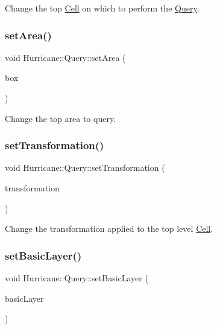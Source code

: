 Change the top \mbox{\hyperlink{classHurricane_1_1Cell}{Cell}} on which to perform the \mbox{\hyperlink{classHurricane_1_1Query}{Query}}. \mbox{\label{classHurricane_1_1Query_ac41de6b1535c256c4929c075769890b1}} 
\subsubsection{\texorpdfstring{set\+Area()}{setArea()}}
{\footnotesize\ttfamily void Hurricane\+::\+Query\+::set\+Area (\begin{DoxyParamCaption}\item[{const \mbox{\hyperlink{classHurricane_1_1Box}{Box}} \&}]{box }\end{DoxyParamCaption})\hspace{0.3cm}{\ttfamily [inline]}}

Change the top area to query. \mbox{\label{classHurricane_1_1Query_a885360fc2f351fc3612c7dda363b5131}} 
\subsubsection{\texorpdfstring{set\+Transformation()}{setTransformation()}}
{\footnotesize\ttfamily void Hurricane\+::\+Query\+::set\+Transformation (\begin{DoxyParamCaption}\item[{const \mbox{\hyperlink{classHurricane_1_1Transformation}{Transformation}} \&}]{transformation }\end{DoxyParamCaption})\hspace{0.3cm}{\ttfamily [inline]}}

Change the transformation applied to the top level \mbox{\hyperlink{classHurricane_1_1Cell}{Cell}}. \mbox{\label{classHurricane_1_1Query_ac3718c4e2cd4d5e80af32558285481af}} 
\subsubsection{\texorpdfstring{set\+Basic\+Layer()}{setBasicLayer()}}
{\footnotesize\ttfamily void Hurricane\+::\+Query\+::set\+Basic\+Layer (\begin{DoxyParamCaption}\item[{const \mbox{\hyperlink{classHurricane_1_1BasicLayer}{Basic\+Layer}} $\ast$}]{basic\+Layer }\end{DoxyParamCaption})\hspace{0.3cm}{\ttfamily [virtual]}}

